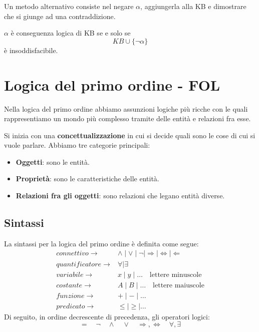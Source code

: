 Un metodo alternativo consiste nel negare $\alpha$, aggiungerla alla KB e dimostrare che si giunge ad una
contraddizione.
\begin{theorem}
	$\alpha$ \`e conseguenza logica di KB se e solo se
	\[ KB \cup \{ \lnot \alpha \} \]
	\`e insoddisfacibile.
\end{theorem}

\section{Logica del primo ordine - FOL}
Nella logica del primo ordine abbiamo assunzioni logiche pi\`u ricche con le quali rappresentiamo un mondo
pi\`u complesso tramite delle entit\`a e relazioni fra esse.

Si inizia con una \textbf{concettualizzazione} in cui si decide quali sono le cose di cui si vuole parlare.
Abbiamo tre categorie principali:
\begin{itemize}
	\item \textbf{Oggetti}: sono le entit\`a.
	\item \textbf{Propriet\`a}: sono le caratteristiche delle entit\`a.
	\item \textbf{Relazioni fra gli oggetti}: sono relazioni che legano entit\`a diverse.
\end{itemize}

\subsection{Sintassi}
La sintassi per la logica del primo ordine \`e definita come segue:
\[
	\begin{array}{rl}
		connettivo \rightarrow     & \wedge \mid \vee \mid \lnot \mid \Rightarrow \mid \Leftrightarrow \mid
		\Leftarrow                                                                                          \\
		quantificatore \rightarrow & \forall \mid \exists                                                   \\
		variabile \rightarrow      & x \mid y \mid \dots \quad \text{lettere minuscole}                     \\
		costante \rightarrow       & A \mid B \mid \dots \quad \text{lettere maiuscole}                     \\
		funzione \rightarrow       & + \mid - \mid \dots                                                    \\
		predicato \rightarrow      & \leq \mid \geq \mid \dots
	\end{array}
\]
Di seguito, in ordine decrescente di precedenza, gli operatori logici:
\[ = \quad \lnot \quad \wedge \quad \vee \quad \Rightarrow, \Leftrightarrow \quad \forall, \exists \]
